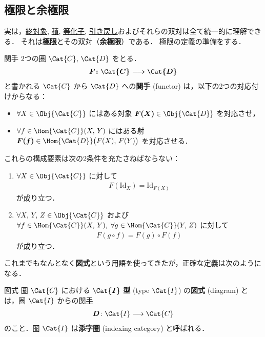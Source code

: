 \documentclass[geometry_main]{subfiles}
\begin{document}
\subsection{極限と余極限}

実は，\hyperref[def:initial-terminal]{終対象}, \hyperref[def:product]{積}, \hyperref[def:equalizer]{等化子}, \hyperref[def:pullback]{引き戻し}およびそれらの双対は全て統一的に理解できる．
それは\textbf{\hyperref[def:limit]{極限}}とその双対（\textbf{余極限}）である．
極限の定義の準備をする．

\begin{mydef}[label=def:functor, breakable]{関手}
	2つの\hyperref[def:category]{圏} $\Cat{C},\, \Cat{D}$ をとる．
	\begin{align}
		\bm{F \colon \Cat{C} \lto \Cat{D}}
	\end{align}
	と書かれる $\Cat{C}$ から $\Cat{D}$ への\textbf{関手} (functor) は，以下の2つの対応付けからなる：
	\begin{itemize}
		\item $\forall X \in \Obj{\Cat{C}}$ にはある対象 $\bm{F(X)} \in \Obj{\Cat{D}}$ を対応させ，
		\item $\forall f \in \Hom{\Cat{C}}(X,\, Y)$ にはある射 $\bm{F(f)} \in \Hom{\Cat{D}} \bigl( F(X),\, F(Y) \bigr)$ を対応させる．
	\end{itemize}
	これらの構成要素は次の2条件を充たさねばならない：
	\begin{enumerate}
		\item $\forall X \in \Obj{\Cat{C}}$ に対して
		\begin{align}
			F(\mathrm{Id}_X) = \mathrm{Id}_{F(X)}
		\end{align}
		が成り立つ．
		\item $\forall X,\, Y,\, Z \in \Obj{\Cat{C}}$ および $\forall f \in \Hom{\Cat{C}}(X,\, Y),\; \forall g \in \Hom{\Cat{C}}(Y,\, Z)$ に対して
		\begin{align}
			F(g \circ f) = F(g) \circ F(f)
		\end{align}
		が成り立つ．
	\end{enumerate}
	
\end{mydef}

これまでもなんとなく\textbf{図式}という用語を使ってきたが，正確な定義は次のようになる．
\begin{mydef}[label=def:diagram]{図式}
	圏 $\Cat{C}$ における $\bm{\Cat{I}}$ \textbf{型} (type $\Cat{I}$) の\textbf{図式} (diagram) とは，圏 $\Cat{I}$ からの\hyperref[def:functor]{関手}
	\begin{align}
		\bm{D} \colon \Cat{I} \lto \Cat{C}
	\end{align}
	のこと．圏 $\Cat{I}$ は\textbf{添字圏} (indexing category) と呼ばれる．
\end{mydef}
\end{document}

